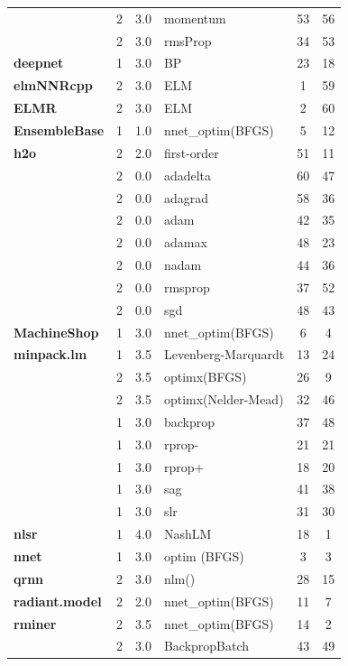\begin{Schunk}
\begin{table}
\begin{tabular}[t]{>{\bfseries}lcclcc}
 & 2 & 3.0 & momentum & 53 & 56\\

\multirow{-4}{*}{\raggedright\arraybackslash deepdive} & 2 & 3.0 & rmsProp & 34 & 53\\
\cmidrule{1-6}
deepnet & 1 & 3.0 & BP & 23 & 18\\
\cmidrule{1-6}
elmNNRcpp & 2 & 3.0 & ELM & 1 & 59\\
\cmidrule{1-6}
ELMR & 2 & 3.0 & ELM & 2 & 60\\
\cmidrule{1-6}
EnsembleBase & 1 & 1.0 & nnet\_optim(BFGS) & 5 & 12\\
\cmidrule{1-6}
h2o & 2 & 2.0 & first-order & 51 & 11\\
\cmidrule{1-6}
 & 2 & 0.0 & adadelta & 60 & 47\\

 & 2 & 0.0 & adagrad & 58 & 36\\

 & 2 & 0.0 & adam & 42 & 35\\

 & 2 & 0.0 & adamax & 48 & 23\\

 & 2 & 0.0 & nadam & 44 & 36\\

 & 2 & 0.0 & rmsprop & 37 & 52\\

\multirow{-7}{*}{\raggedright\arraybackslash keras} & 2 & 0.0 & sgd & 48 & 43\\
\cmidrule{1-6}
MachineShop & 1 & 3.0 & nnet\_optim(BFGS) & 6 & 4\\
\cmidrule{1-6}
minpack.lm & 1 & 3.5 & Levenberg-Marquardt & 13 & 24\\
\cmidrule{1-6}
 & 2 & 3.5 & optimx(BFGS) & 26 & 9\\

\multirow{-2}{*}{\raggedright\arraybackslash monmlp} & 2 & 3.5 & optimx(Nelder-Mead) & 32 & 46\\
\cmidrule{1-6}
 & 1 & 3.0 & backprop & 37 & 48\\

 & 1 & 3.0 & rprop- & 21 & 21\\

 & 1 & 3.0 & rprop+ & 18 & 20\\

 & 1 & 3.0 & sag & 41 & 38\\

\multirow{-5}{*}{\raggedright\arraybackslash neuralnet} & 1 & 3.0 & slr & 31 & 30\\
\cmidrule{1-6}
nlsr & 1 & 4.0 & NashLM & 18 & 1\\
\cmidrule{1-6}
nnet & 1 & 3.0 & optim (BFGS) & 3 & 3\\
\cmidrule{1-6}
qrnn & 2 & 3.0 & nlm() & 28 & 15\\
\cmidrule{1-6}
radiant.model & 2 & 2.0 & nnet\_optim(BFGS) & 11 & 7\\
\cmidrule{1-6}
rminer & 2 & 3.5 & nnet\_optim(BFGS) & 14 & 2\\
\cmidrule{1-6}
 & 2 & 3.0 & BackpropBatch & 43 & 49\\


\end{tabular}
\end{table}
\end{Schunk}
